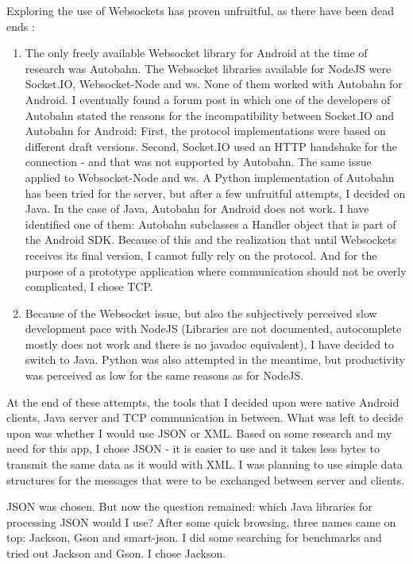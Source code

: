 \documentclass{article}
\begin{document}
Exploring the use of Websockets has proven unfruitful, as there have been dead
ends :
\begin{enumerate}
  \item The only freely available Websocket library for Android at the time of
  research was Autobahn. The Websocket libraries available for NodeJS were
  Socket.IO, Websocket-Node and ws. None of them worked with Autobahn for
  Android. I eventually found a forum post in which one of the developers of
  Autobahn stated the reasons for the incompatibility between Socket.IO and
  Autobahn for Android: First, the protocol implementations were based on
  different draft versions. Second, Socket.IO used an HTTP handshake for the
  connection - and that was not supported by Autobahn. The same issue applied to
  Websocket-Node and ws. A Python implementation of Autobahn has been tried for
  the server, but after a few unfruitful attempts, I decided on Java. In the
  case of Java, Autobahn for Android does not work. I have identified one of
  them: Autobahn subclasses a Handler object that is part of the Android SDK.
  Because of this and the realization that until Websockets receives its final
  version, I cannot fully rely on the protocol. And for the purpose of a
  prototype application where communication should not be overly complicated, I
  chose TCP.
  
  \item Because of the Websocket issue, but also the subjectively perceived slow
  development pace with NodeJS (Libraries are not documented, autocomplete
  mostly does not work and there is no javadoc equivalent), I have decided to
  switch to Java. Python was also attempted in the meantime, but productivity
  was perceived as low for the same reasons as for NodeJS.  
\end{enumerate}

At the end of these attempts, the tools that I decided upon were native Android
clients, Java server and TCP communication in between. What was left to decide
upon was whether I would use JSON or XML. Based on some research and my need for
this app, I chose JSON - it is easier to use and it takes less bytes to transmit
the same data as it would with XML. I was planning to use simple data structures
for the messages that were to be exchanged between server and clients.\newline

JSON was chosen. But now the question remained: which Java libraries for
processing JSON would I use? After some quick browsing, three names came on top:
Jackson, Gson and smart-json. I did some searching for benchmarks and tried out
Jackson and Gson. I chose Jackson.\newline
\end{document}
